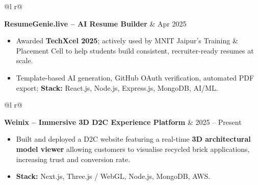 \documentclass[a4paper,10pt]{article}
\begin{document}
\begin{tabularx}{\linewidth}{ @{}l r@{} }

\textbf{ResumeGenie.live -- AI Resume Builder} & \textcolor[HTML]{371e77}{Apr 2025} \\


\end{tabularx}

\vspace{-8pt}

\begin{itemize}[nosep, leftmargin=1.5em, itemsep=0pt, topsep=0pt]

\item Awarded \textbf{TechXcel 2025}; actively used by MNIT Jaipur's Training \& Placement Cell to help students build consistent, recruiter-ready resumes at scale.

\item Template-based AI generation, GitHub OAuth verification, automated PDF export; \textbf{Stack:} React.js, Node.js, Express.js, MongoDB, AI/ML.

\end{itemize}



\begin{tabularx}{\linewidth}{ @{}l r@{} }

\textbf{Weinix -- Immersive 3D D2C Experience Platform} & \textcolor[HTML]{371e77}{2025 -- Present} \\


\end{tabularx}

\vspace{-8pt}

\begin{itemize}[nosep, leftmargin=1.5em, itemsep=0pt, topsep=0pt]

\item Built and deployed a D2C website featuring a real-time \textbf{3D architectural model viewer} allowing customers to visualise recycled brick applications, increasing trust and conversion rate.

\item \textbf{Stack:} Next.js, Three.js / WebGL, Node.js, MongoDB, AWS.

\end{itemize}
\end{document}
